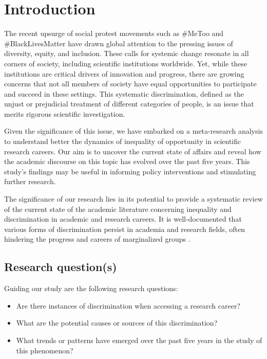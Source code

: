 \documentclass[runningheads]{llncs}
\begin{document}
\section{Introduction}
The recent upsurge of social protest movements such as \#MeToo \cite{joanpere2022history} and \#BlackLivesMatter \cite{nguyen2022black} have drawn global attention to the pressing issues of diversity, equity, and inclusion. These calls for systemic change resonate in all corners of society, including scientific institutions worldwide. Yet, while these institutions are critical drivers of innovation and progress, there are growing concerns that not all members of society have equal opportunities to participate and succeed in these settings. This systematic discrimination, defined as the unjust or prejudicial treatment of different categories of people, is an issue that merits rigorous scientific investigation.

Given the significance of this issue, we have embarked on a meta-research analysis to understand better the dynamics of inequality of opportunity in scientific research careers. Our aim is to uncover the current state of affairs and reveal how the academic discourse on this topic has evolved over the past five years. This study's findings may be useful in informing policy interventions and stimulating further research.

The significance of our research lies in its potential to provide a systematic review of the current state of the academic literature concerning inequality and discrimination in academic and research careers. It is well-documented that various forms of discrimination persist in academia and research fields, often hindering the progress and careers of marginalized groups \cite{shor2015paper}.

\subsection{Research question(s)}
Guiding our study are the following research questions:
\begin{itemize}
\item Are there instances of discrimination when accessing a research career?
\item What are the potential causes or sources of this discrimination?
\item What trends or patterns have emerged over the past five years in the study of this phenomenon?
\end{itemize}
\end{document}
